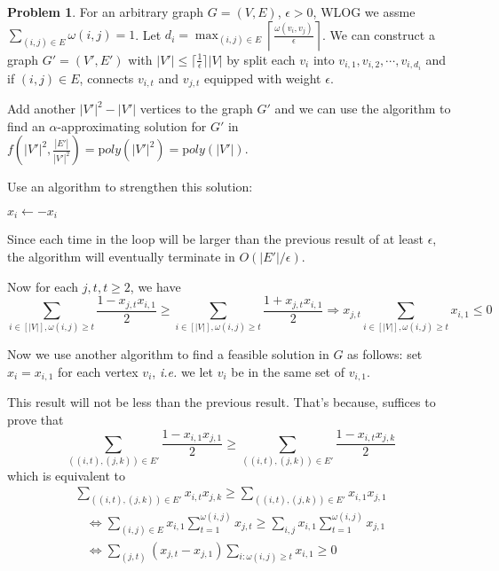 \documentclass[a4paper]{article}
\theoremstyle{definition}
\newtheorem{problem}{Problem}
\theoremstyle{plain}
\newcommand{\dps}{\displaystyle}
\newcommand{\<}{\left<}
\renewcommand{\>}{\right>}
\numberwithin{equation}{problem}
\newcommand{\ie}{ \textit{ i.e. } }
\newcommand{\st}{ \textit{ s.t. }}
\begin{document}
\begin{problem}
  For an arbitrary graph $ G=(V,E) $,  $ \epsilon>0 $, WLOG we assme  $ \dps\sum_{(i,j)\in E}\omega(i,j)=1 $.  Let  $\dps d_i=\max_{(i,j)\in E}\left\lceil \frac{\omega(v_i,v_j)}{\epsilon} \right\rceil  $. We can construct a graph  $ G'=(V',E') $ with  $ |V'| \leq \lceil\frac{1}{\epsilon}\rceil|V| $ by split each  $ v_i $ into  $ v_{i,1},v_{i,2},\cdots,v_{i,d_i} $ and if  $ (i,j)\in E $, connects  $ v_{i,t} $   and  $ v_{j,t} $ equipped with weight  $ \epsilon $.
  
  Add another  $ |V'|^2-|V'| $ vertices to the graph  $ G' $ and we can use the algorithm to find an  $ \alpha $-approximating solution for  $ G' $ in  $ f(|V'|^2,\dps\frac{|E'|}{|V'|^2})=\mathrm poly(|V'|^2)=\mathrm poly(|V'|) $.

  Use an algorithm to strengthen this solution:

  \begin{algorithm}
    \begin{algorithmic}[H]
      \FOR{$ \exists (i,t) $ \st  $ \dps\sum_{j\in [|V|]}\epsilon \cdot \mathbf{1}[((i,t),(j,t))\in E',x_{i,t}x_{j,t}<0]<\dps\dps\sum_{j\in [|V'|]}\epsilon \cdot \mathbf{1}[((i,t),(j,t))\in E',x_{i,t}x_{j,t}>0] $}
      \STATE  $ x_i\leftarrow-x_i $
      \ENDFOR  
    \end{algorithmic}
  \end{algorithm}

  Since each time in the loop will be larger than the previous result of at least  $ \epsilon $, the algorithm will eventually terminate in  $ O(|E'|/\epsilon) $.

  Now for each  $ j,t,t \geq 2 $, we have 
  \[\sum_{i\in [|V|],\omega(i,j) \geq t}\frac{1-x_{j,t}x_{i,1}}{2} \geq \sum_{i\in [|V|],\omega(i,j) \geq t}\frac{1+x_{j,t}x_{i,1}}{2}\Rightarrow x_{j,t}\sum_{i\in [|V|],\omega(i,j) \geq t}x_{i,1} \leq0 \] 
  
  Now we use another algorithm to find a feasible solution in  $ G $ as follows:
  set  $ x_i=x_{i,1} $ for each vertex  $ v_i $, \ie we let  $ v_i $ be in the same set of  $ v_{i,1} $.
  
  This result will not be less than the previous result. That's because, suffices to prove that 
  \[\sum_{((i,t),(j,k))\in E'}\frac{1-x_{i,1}x_{j,1}}{2} \geq \sum_{((i,t),(j,k))\in E'}\frac{1-x_{i,t}x_{j,k}}{2}\] 
  which is equivalent to
  \[\begin{aligned}
    \sum_{((i,t),(j,k))\in E'}x_{i,t}x_{j,k} \geq \sum_{((i,t),(j,k))\in E'}x_{i,1}x_{j,1}
  \end{aligned}\]
  \[\begin{aligned}
    &\Leftrightarrow \sum_{(i,j)\in E}x_{i,1}\sum_{t=1}^{\omega(i,j)}x_{j,t} \geq \sum_{i,j}x_{i,1}\sum_{t=1}^{\omega(i,j)}x_{j,1}\\
    &\Leftrightarrow \sum_{(j,t)}(x_{j,t}-x_{j,1})\sum_{i:\omega(i,j) \geq t}x_{i,1} \geq 0
  \end{aligned}\] 
\end{problem}
\end{document}
